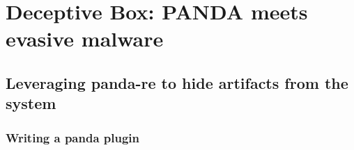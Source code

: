 \chapter{Deceptive Box: PANDA meets evasive malware}

\section{Leveraging panda-re to hide artifacts from the system}

\subsection{Writing a panda plugin}